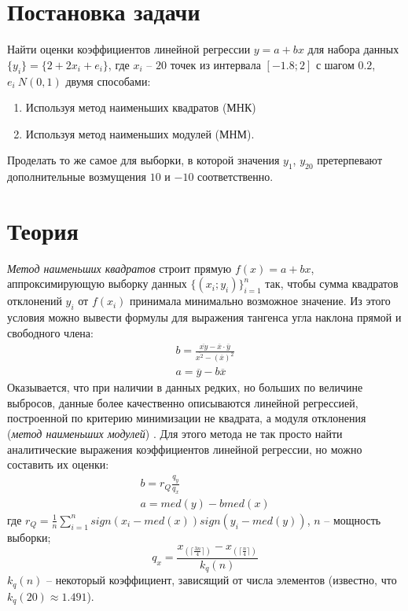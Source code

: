 \documentclass[main.tex]{subfiles}
\begin{document}
\section{Постановка задачи}
Найти оценки коэффициентов линейной регрессии $y= a + bx$ для набора данных $\{y_i\} = \{2 + 2x_i + e_i\}$, где $x_i$ -- $20$ точек из интервала $[-1.8;2]$ с шагом $0.2$, $e_i ~ N(0,1)$ двумя способами:
\begin{enumerate}
	\item Используя метод наименьших квадратов (МНК)
	\item Используя метод наименьших модулей (МНМ).
\end{enumerate}
Проделать то же самое для выборки, в которой значения $y_1$, $y_{20}$ претерпевают дополнительные возмущения $10$ и $-10$ соответственно.
\newpage
\section{Теория}
\emph{Метод наименьших квадратов} \cite{sevastianov} строит прямую $f(x) = a + bx$, аппроксимирующую выборку данных $\{(x_i;y_i)\}_{i=1}^{n}$ так, чтобы сумма квадратов отклонений $y_i$ от $f(x_i)$ принимала минимально возможное значение. Из этого условия можно вывести формулы для выражения тангенса угла наклона прямой и свободного члена:
\begin{gather}
	\label{eq:least_sq_b}
	b = \frac{\overline{xy} - \overline{x}\cdot\overline{y}}{\overline{x^2}-(\overline{x})^2}\\
	\label{eq:least_sq_a}
	a = \overline{y}-b\overline{x}
\end{gather}
Оказывается, что при наличии в данных редких, но больших по величине выбросов, данные более качественно описываются линейной регрессией, построенной по критерию минимизации не квадрата, а модуля отклонения (\emph{метод наименьших модулей}) \cite{sevastianov}. Для этого метода не так просто найти аналитические выражения коэффициентов линейной регрессии, но можно составить их оценки:
\begin{gather}
\label{eq:least_mod_b}
b = r_Q \frac{q_y}{q_x}\\
\label{eq:least_mod_a}
a = med(y)-b med(x)
\end{gather}
где $r_Q=\frac{1}{n} \sum_{i=1}^{n} sign(x_i - med(x))sign(y_i-med(y))$, $n$ -- мощность выборки;
\begin{equation}\label{eq:interquartile}
	q_x = \frac{x_{(\lceil\frac{3n}{4}\rceil)} - x_{(\lceil\frac{n}{4}\rceil)}}{k_q(n)}
\end{equation}
$k_q(n)$ -- некоторый коэффициент, зависящий от числа элементов (известно, что $k_q(20)\approx 1.491$).
 
\end{document}
